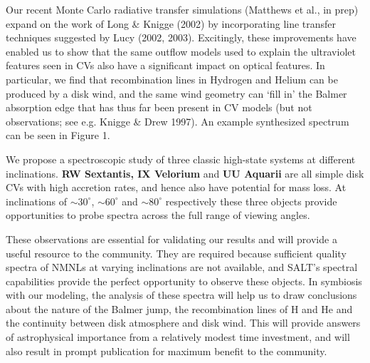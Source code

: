\bigskip
Our recent Monte Carlo radiative transfer simulations (Matthews et al., in prep) expand on the work of Long \& Knigge (2002) by incorporating line transfer techniques suggested by Lucy (2002, 2003). Excitingly, these improvements have enabled us to show that the same outflow models used to explain the ultraviolet features seen in CVs also have a significant impact on optical features. In particular, we find that recombination lines in Hydrogen and Helium can be produced by a disk wind, and the same wind geometry can `fill in' the Balmer absorption edge that has thus far been present in CV models (but not observations; see e.g. Knigge \& Drew 1997). An example synthesized spectrum can be seen in Figure 1.

\bigskip
We propose a spectroscopic study of three classic high-state systems at different inclinations. {\bf RW Sextantis, IX Velorium} and {\bf UU Aquarii} are all simple disk CVs with high accretion rates, and hence also have potential for mass loss. At inclinations of $\sim30^\circ$, $\sim60^\circ$ and $\sim80^\circ$ respectively these three objects provide opportunities to probe spectra across the full range of viewing angles. 

\bigskip
These observations are essential for validating our results and will provide a useful resource to the community. They are required because sufficient quality spectra of NMNLs at varying inclinations are not available, and SALT's spectral capabilities provide the perfect opportunity to observe these objects.
In symbiosis with our modeling, the analysis of these spectra will help us to draw conclusions about the nature of the Balmer jump, the recombination lines of H and He and the continuity between disk atmosphere and disk wind. This will provide answers of astrophysical importance from a relatively modest time investment, and will also result in prompt publication for maximum benefit to the community.